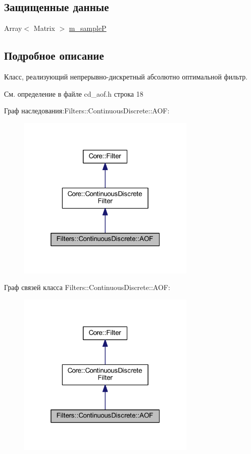 \subsection*{Защищенные данные}
\begin{DoxyCompactItemize}
\item 
Array$<$ Matrix $>$ \hyperlink{class_filters_1_1_continuous_discrete_1_1_a_o_f_a31111852e94dab62675d8692a4c22df1}{m\+\_\+sampleP}
\end{DoxyCompactItemize}


\subsection{Подробное описание}
Класс, реализующий непрерывно-\/дискретный абсолютно оптимальной фильтр. 

См. определение в файле cd\+\_\+aof.\+h строка 18



Граф наследования\+:Filters\+:\+:Continuous\+Discrete\+:\+:A\+OF\+:\nopagebreak
\begin{figure}[H]
\begin{center}
\leavevmode
\includegraphics[width=241pt]{class_filters_1_1_continuous_discrete_1_1_a_o_f__inherit__graph}
\end{center}
\end{figure}


Граф связей класса Filters\+:\+:Continuous\+Discrete\+:\+:A\+OF\+:\nopagebreak
\begin{figure}[H]
\begin{center}
\leavevmode
\includegraphics[width=241pt]{class_filters_1_1_continuous_discrete_1_1_a_o_f__coll__graph}
\end{center}
\end{figure}


